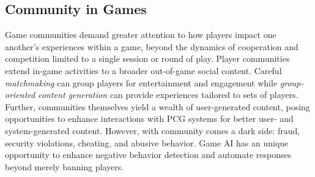 \documentclass[conference]{IEEEtran}
\begin{document}

\subsection{Community in Games}

Game communities demand greater attention to how players impact one another's experiences within a game, beyond the dynamics of cooperation and competition limited to a single session or round of play. 
Player communities extend in-game activities to a broader out-of-game social content.
%
Careful {\em matchmaking} can group players for entertainment and engagement while {\em group-oriented content generation} can provide experiences tailored to sets of players.
Further, communities themselves yield a wealth of user-generated content, posing opportunities to enhance interactions with PCG systems for better user- and system-generated content.
However, with community comes a dark side: fraud, security violations, cheating, and abusive behavior. 
Game AI has an unique opportunity to enhance negative behavior detection and automate responses beyond merely banning players.

\end{document}

